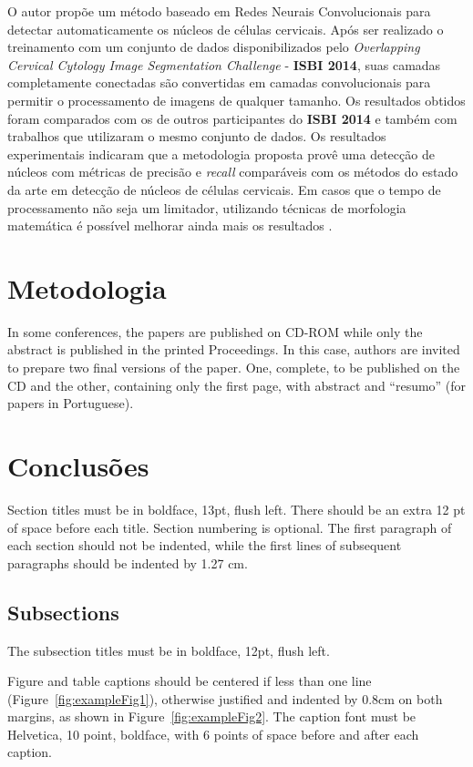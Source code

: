 \documentclass[12pt]{article}
\begin{document}
O autor propõe um método baseado em Redes Neurais Convolucionais para detectar automaticamente os núcleos de células cervicais. Após ser realizado o treinamento com um conjunto de dados disponibilizados pelo \textit{Overlapping Cervical Cytology Image Segmentation Challenge} - \textbf{ISBI 2014}, suas camadas completamente conectadas são convertidas em camadas convolucionais para permitir o processamento de imagens de qualquer tamanho. Os resultados obtidos foram comparados com os de outros participantes do \textbf{ISBI 2014} e também com trabalhos que utilizaram o mesmo conjunto de dados. Os resultados experimentais indicaram que a metodologia proposta provê uma detecção de núcleos com métricas de precisão e \textit{recall} comparáveis com os métodos do estado da arte em detecção de núcleos de células cervicais. Em casos que o tempo de processamento não seja um limitador, utilizando técnicas de morfologia matemática é possível melhorar ainda mais os resultados \cite{braz2018detecccao}.


\section{Metodologia}

In some conferences, the papers are published on CD-ROM while only the
abstract is published in the printed Proceedings. In this case, authors are
invited to prepare two final versions of the paper. One, complete, to be
published on the CD and the other, containing only the first page, with
abstract and ``resumo'' (for papers in Portuguese).

\section{Conclusões}

Section titles must be in boldface, 13pt, flush left. There should be an extra
12 pt of space before each title. Section numbering is optional. The first
paragraph of each section should not be indented, while the first lines of
subsequent paragraphs should be indented by 1.27 cm.

\subsection{Subsections}

The subsection titles must be in boldface, 12pt, flush left.



Figure and table captions should be centered if less than one line
(Figure~\ref{fig:exampleFig1}), otherwise justified and indented by 0.8cm on
both margins, as shown in Figure~\ref{fig:exampleFig2}. The caption font must
be Helvetica, 10 point, boldface, with 6 points of space before and after each
caption.
\end{document}
